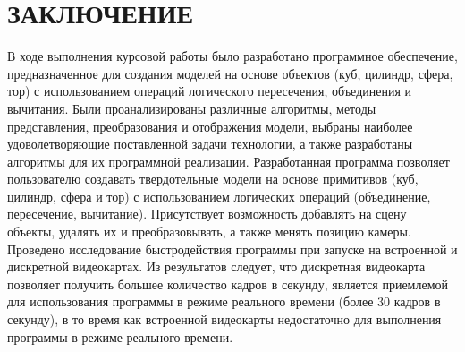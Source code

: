 \section*{ЗАКЛЮЧЕНИЕ}
В  ходе  выполнения  курсовой работы  было  разработано  программное обеспечение, предназначенное для создания моделей на основе объектов (куб, цилиндр, сфера, тор) с использованием операций логического пересечения, объединения и 
вычитания.  
Были  проанализированы  различные  алгоритмы,  методы  представления, 
преобразования  и  отображения  модели,  выбраны  наиболее  удоволетворяющие  поставленной  задачи  технологии,  а  также  разработаны  алгоритмы  для  их 
программной реализации. 
Разработанная программа позволяет пользователю создавать твердотельные модели на основе примитивов (куб, цилиндр, сфера и тор) с использованием логических операций (объединение, пересечение, вычитание). 
Присутствует возможность добавлять на сцену объекты, удалять их и преобразовывать, а также менять позицию камеры.
Проведено исследование быстродействия программы при запуске на встроенной и дискретной видеокартах. Из результатов следует, что дискретная видеокарта позволяет получить большее количество кадров в секунду, является приемлемой для использования программы в режиме реального времени (более 30 кадров в секунду), в то время как встроенной видеокарты недостаточно для выполнения программы в режиме реального времени.

\pagebreak